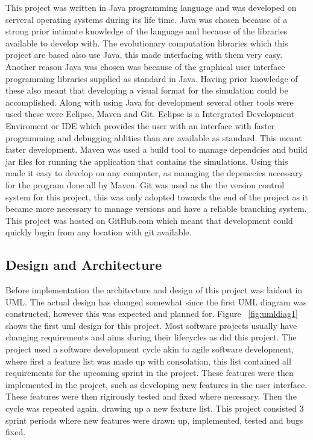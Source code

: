 \documentclass[12pt]{article}
\begin{document}
This project was written in Java programming language and was developed on serveral operating systems during its life time. 
Java was chosen because of a strong prior intimate knowledge of the language and because of the libraries available to develop with. 
The evolutionary computation libraries which this project are based also use Java, this made interfacing with them very easy. 
Another reason Java was chosen was because of the graphical user interface programming libraries supplied as standard in Java. 
Having prior knowledge of these also meant that developing a visual format for the simulation could be accomplished.  Along with using 
Java for development several other tools were used these were Eclipse, Maven and Git. Eclipse is a Intergrated Development Enviroment or 
IDE which provides the user with an interface with faster programming and debugging ablities than are available as standard.
This meant faster development. Maven was used a build tool to manage dependcies and build jar files for running the application 
that contains the simulations. Using this made it easy to develop on any computer, as managing the depenecies necessary for the 
program done all by Maven. Git was used as the the version control system for this project, this was only adopted towards the 
end of the project as it became more necessary to manage versions and have a reliable branching system. This project was hosted 
on GitHub.com which meant that development could quickly begin from any location with git available. 

\subsection{Design and Architecture}

Before implementation the architecture and design of this project was laidout in UML. The actual design has changed somewhat since the first UML diagram was
constructed, however this was expected and planned for. Figure ~\ref{fig:umldiag1} shows the first uml design for this project.
Most software projects usually have changing requirements and aims during their lifecycles as did this project. The project 
used a software development cycle akin to agile software development, where first a feature list was made up with consolation, this
list contained all requirements for the upcoming sprint in the project. These features were then implemented in the project, such
as developing new features in the user interface. These features were then rigirously tested and fixed where necessary. Then 
the cycle was repeated again, drawing up a new feature list.  This project consisted 3 sprint periods where new features 
were drawn up, implemented, tested and bugs fixed.
\end{document}
